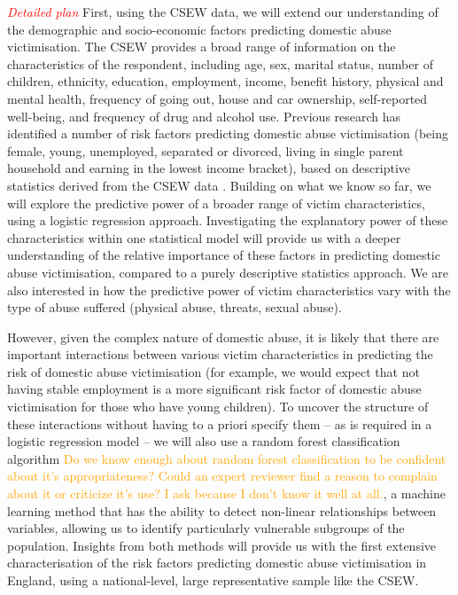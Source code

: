 \documentclass[11pt, a4paper]{article}
\newcommand{\TM}[1] {{\textcolor{orange}{#1}}}
\begin{document}
\textcolor{red}{\textit{Detailed plan}} First, using the CSEW data, we will extend our understanding of the demographic and socio-economic factors predicting domestic abuse victimisation. The CSEW provides a broad range of information on the characteristics of the respondent, including age, sex, marital status, number of children, ethnicity, education, employment, income, benefit history, physical and mental health, frequency of going out, house and car ownership, self-reported well-being, and frequency of drug and alcohol use. Previous research has identified a number of risk factors predicting domestic abuse victimisation (being female, young, unemployed, separated or divorced, living in single parent household and earning in the lowest income bracket), based on descriptive statistics derived from the CSEW data \cite{ONS}. Building on what we know so far, we will explore the predictive power of a broader range of victim characteristics, using a logistic regression approach. Investigating the explanatory power of these characteristics within one statistical model will provide us with a deeper understanding of the relative importance of these factors in predicting domestic abuse victimisation, compared to a purely descriptive statistics approach. We are also interested in how the predictive power of victim characteristics vary with the type of abuse suffered (physical abuse, threats, sexual abuse).

 However, given the complex nature of domestic abuse, it is likely that there are important interactions between various victim characteristics in predicting the risk of domestic abuse victimisation (for example, we would expect that not having stable employment is a more significant risk factor of domestic abuse victimisation for those who have young children). To uncover the structure of these interactions without having to a priori specify them -- as is required in a logistic regression model -- we will also use a random forest classification algorithm \TM{Do we know enough about random forest classification to be confident about it's appropriateness? Could an expert reviewer find a reason to complain about it or criticize it's use? I ask because I don't know it well at all.}, a machine learning method that has the ability to detect non-linear relationships between variables, allowing us to identify particularly vulnerable subgroups of the population. Insights from both methods will provide us with the first extensive characterisation of the risk factors predicting domestic abuse victimisation in England, using a national-level, large representative sample like the CSEW.
 
\end{document}
